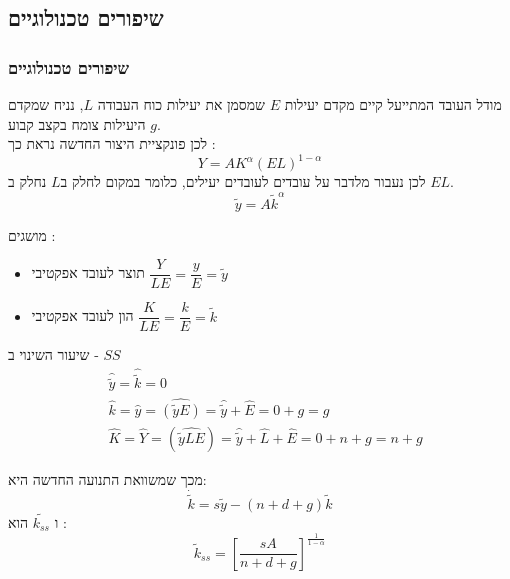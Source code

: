 \documentclass[usenames,dvipsnames]{beamer}
\begin{document}
\begin{RTL}
\section{שיפורים טכנולוגיים}

\begin{frame}[allowframebreaks]
    \frametitle{שיפורים טכנולוגיים}
    \begin{block}{מודל העובד המתייעל}
        קיים מקדם יעילות $E$ שמסמן את יעילות כוח העבודה $L$, נניח שמקדם היעילות צומח בקצב קבוע $g$. \\
        לכן פונקציית היצור החדשה נראת כך : 
        $$Y =  A K^{\alpha} \left(EL\right) ^ {1-\alpha}$$
        לכן נעבור מלדבר על עובדים לעובדים יעילים, כלומר במקום לחלק ב$L$ נחלק ב $EL$.
        $$\tilde{y} = A \tilde{k}^\alpha$$

    \end{block}
    מושגים : 
    \begin{itemize}
        \item תוצר לעובד אפקטיבי \quad $\dfrac{Y}{LE} = \dfrac{y}{E} = \tilde{y}$
        \item הון לעובד אפקטיבי \quad $\dfrac{K}{LE} = \dfrac{k}{E} = \tilde{k}$
    \end{itemize}


    \framebreak

    \begin{block}{שיעור השינוי ב - $SS$}
        \begin{equation*}
            \begin{aligned}
            & \hat{\tilde{y}}=\hat{\tilde{k}}=0 \\
            & \hat{k}=\hat{y}=\widehat{(\tilde{y} E)}=\hat{\tilde{y}}+\hat{E}=0+g=g \\
            & \widehat{K}=\hat{Y}=(\widehat{\tilde{y} L E})=\hat{\tilde{y}}+\hat{L}+\hat{E}=0+n+g=n+g
        \end{aligned}
        \end{equation*}
    \end{block}
    מכך שמשוואת התנועה החדשה היא:
    \begin{equation*}
        \dot{\tilde{k}}=s \tilde{y}-(n+d+g) \tilde{k}
    \end{equation*}
    ו $\tilde{k_{ss}}$ הוא : 
    \begin{equation*}
        \tilde{k}_{s s}=\left[\frac{s A}{n+d+g}\right]^{\frac{1}{1-\alpha}}
    \end{equation*}

    \framebreak


\end{frame}
\end{RTL}
\end{document}
